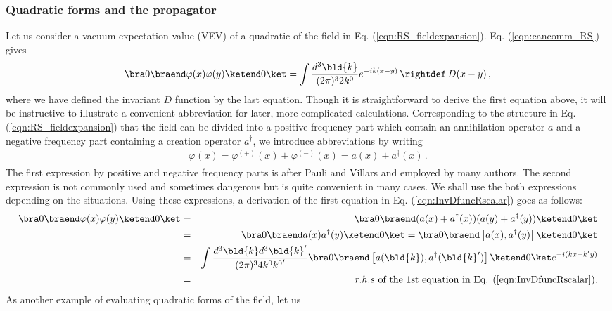 \subsubsection{Quadratic forms and the propagator}
Let us consider a vacuum expectation value (VEV) of 
a quadratic of the field in Eq. (\ref{eqn:RS_fieldexpansion}).
Eq. (\ref{eqn:cancomm_RS}) gives
\begin{eqnarray}
\bra 0 \braend \varphi(x) \varphi(y) \ketend 0 \ket
=
\int \frac{d^3 \bld{k} }{(2\pi)^3 2 k^0} 
e^{-ik(x - y)}
\,\rightdef\,
D(x-y)\,,
\label{eqn:InvDfuncRscalar}
\end{eqnarray}
where we have defined the invariant $D$ function by the last equation.
Though it is straightforward to derive the  first equation above, 
it will be instructive to illustrate a convenient abbreviation for later,
more complicated calculations. Corresponding to the structure in Eq. (\ref{eqn:RS_fieldexpansion})
that the field can be divided into a positive frequency part which contain an annihilation operator
$a$ and a negative frequency part containing a creation operator $a^\dagger$,
we introduce abbreviations by writing
\begin{eqnarray}
\varphi_{}(x) = 
\varphi^{(+)}(x) + \varphi^{(-)}(x)
=
a(x) + a^\dagger (x) \,.
\label{eqn:RscalarFiledAbbrev}
\end{eqnarray}
The first expression by positive and negative frequency parts is after Pauli and Villars
and employed by many authors. The second expression is not commonly used
and sometimes dangerous but is quite convenient in many cases. We shall use
the both expressions depending on the situations. 
Using these expressions, a derivation of the first equation in Eq. (\ref{eqn:InvDfuncRscalar}) goes as follows:
\begin{eqnarray}
\bra 0 \braend \varphi(x) \varphi(y) \ketend 0 \ket
&=&
\bra 0 \braend (a(x) + a^\dagger(x) )( a(y) + a^\dagger(y) ) \ketend 0 \ket
\nonumber\\
&=&
\bra 0 \braend a(x) a^\dagger(y) \ketend 0 \ket
=
\bra 0 \braend \left[ a(x), a^\dagger(y) \right] \ketend 0 \ket
\nonumber\\
&=&
\int \frac{d^3 \bld{k} d^3 \bld{k}'}{(2\pi)^3 4 k^0 {k^0}'} 
\bra 0 \braend \left[ a(\bld{k}), a^\dagger(\bld{k}') \right] \ketend 0 \ket
e^{-i(kx - k'y)}
\nonumber\\
&=&
r.h.s\mbox{ of the 1st equation in Eq. (\ref{eqn:InvDfuncRscalar})}.
\end{eqnarray}
As another example of evaluating quadratic forms of the field, let us
